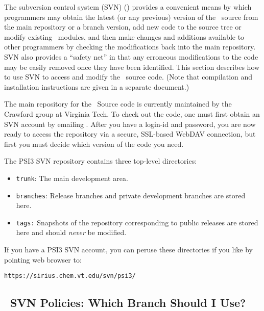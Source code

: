 %
%
%
%

The subversion control system (SVN) () provides a
convenient means by which programmers may obtain the latest (or any
previous) version of the \PSIthree\ source from the main repository or
a branch version, add new code to the source tree or modify existing
\PSIthree\ modules, and then make changes and additions available to
other programmers by checking the modifications back into the main
repository.  SVN also provides a ``safety net'' in that any erroneous
modifications to the code may be easily removed once they have been
identified.  This section describes how to use SVN to access and
modify the \PSIthree\ source code.  (Note that compilation and
installation instructions are given in a separate document.)

The main repository for the \PSIthree\ Source code is currently
maintained by the Crawford group at Virginia Tech.  To check out the
code, one must first obtain an SVN account by emailing
.
After you have a login-id and password, you are now ready to access
the repository via a secure, SSL-based WebDAV connection, but first
you must decide which version of the code you need.

The PSI3 SVN repository contains three top-level directories:
\begin{itemize}
\item {\tt trunk}: The main development area.
\item {\tt branches}: Release branches and private development
  branches are stored here.
\item {\tt tags:} Snapshots of the repository corresponding to public
  releases are stored here and should {\em never} be modified.
\end{itemize}
If you have a PSI3 SVN account, you can peruse these directories if
you like by pointing web browser to:

\noindent
{\tt https://sirius.chem.vt.edu/svn/psi3/}

\subsection{\PSIthree\ SVN Policies: Which Branch Should I Use?}
\label{section:branches}

